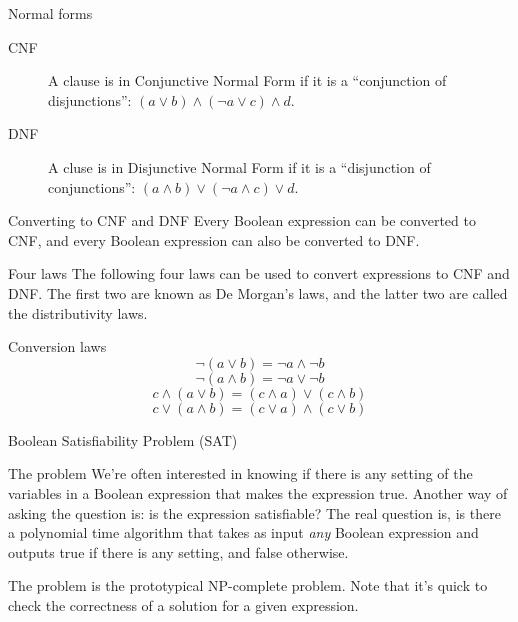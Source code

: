 \begin{frame}{Normal forms}
  \begin{description}
    \item[CNF] A clause is in Conjunctive Normal Form if it is a ``conjunction of disjunctions'': $(a \vee b) \wedge (\neg a \vee c) \wedge d$.
    \vspace{0.5cm}
    \item[DNF] A cluse is in Disjunctive Normal Form if it is a ``disjunction of conjunctions'': $(a \wedge b) \vee (\neg a \wedge c) \vee d$.
  \end{description}
  \vspace{0.5cm}
  {\begin{block}{Converting to CNF and DNF}
    Every Boolean expression can be converted to CNF, and every Boolean expression can also be converted to DNF.
  \end{block}}
\end{frame}


\begin{frame}{Four laws}
  The following four laws can be used to convert expressions to CNF and DNF.
  The first two are known as De Morgan's laws, and the latter two are called the distributivity laws.
  \vspace{0.5cm}
  {\begin{block}{Conversion laws}
    \[ \neg ( a \vee b) = \neg a \wedge \neg b \]
    \[ \neg ( a \wedge b) = \neg a \vee \neg b \]
    \[ c \wedge ( a \vee b) = (c \wedge a) \vee (c \wedge b) \]
    \[ c \vee ( a \wedge b) = (c \vee a) \wedge (c \vee b) \]
  \end{block}}
\end{frame}


\begin{frame}{Boolean Satisfiability Problem (SAT)}
  {
    \begin{block}{The problem}
    We're often interested in knowing if there is any setting of the variables in a Boolean expression that makes the expression true.
    Another way of asking the question is: is the expression satisfiable?
    The real question is, is there a polynomial time algorithm that takes as input \emph{any} Boolean expression and outputs true if there is any setting, and false otherwise.
  \end{block}}
  \vspace{0.5cm}
  The problem is the prototypical NP-complete problem.
  Note that it's quick to check the correctness of a solution for a given expression. 
\end{frame}


